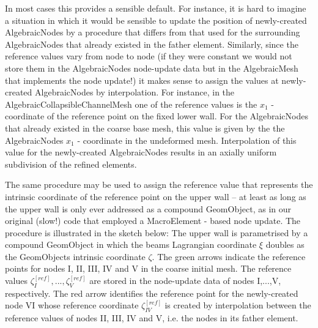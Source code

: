 In most cases this provides a sensible default. For instance, it is hard to imagine a situation in which it would be sensible to update the position of newly-\/created {\ttfamily Algebraic\+Nodes} by a procedure that differs from that used for the surrounding {\ttfamily Algebraic\+Nodes} that already existed in the father element. Similarly, since the reference values vary from node to node (if they were constant we would not store them in the {\ttfamily Algebraic\+Nodes\textquotesingle{}} node-\/update data but in the {\ttfamily Algebraic\+Mesh} that implements the node update!) it makes sense to assign the values at newly-\/created {\ttfamily Algebraic\+Nodes} by interpolation. For instance, in the {\ttfamily Algebraic\+Collapsible\+Channel\+Mesh} one of the reference values is the $ x_1 $ -\/ coordinate of the reference point on the fixed lower wall. For the {\ttfamily Algebraic\+Nodes} that already existed in the coarse base mesh, this value is given by the the {\ttfamily Algebraic\+Nodes\textquotesingle{}} $ x_1 $ -\/ coordinate in the undeformed mesh. Interpolation of this value for the newly-\/created {\ttfamily Algebraic\+Nodes} results in an axially uniform subdivision of the refined elements.

The same procedure may be used to assign the reference value that represents the intrinsic coordinate of the reference point on the upper wall -- at least as long as the upper wall is only ever addressed as a compound {\ttfamily Geom\+Object}, as in our original (slow!) code that employed a {\ttfamily Macro\+Element} -\/ based node update. The procedure is illustrated in the sketch below\+: The upper wall is parametrised by a compound {\ttfamily Geom\+Object} in which the beam\textquotesingle{}s Lagrangian coordinate $ \xi $ doubles as the {\ttfamily Geom\+Object\textquotesingle{}s} intrinsic coordinate $ \zeta. $ The green arrows indicate the reference points for nodes I, II, I\+II, IV and V in the coarse initial mesh. The reference values $ \zeta_{I}^{[ref]}, ... , \zeta_{V}^{[ref]} $ are stored in the node-\/update data of nodes I,...,V, respectively. The red arrow identifies the reference point for the newly-\/created node VI whose reference coordinate $ \zeta_{IV}^{[ref]} $ is created by interpolation between the reference values of nodes II, I\+II, IV and V, i.\+e. the nodes in its father element.


